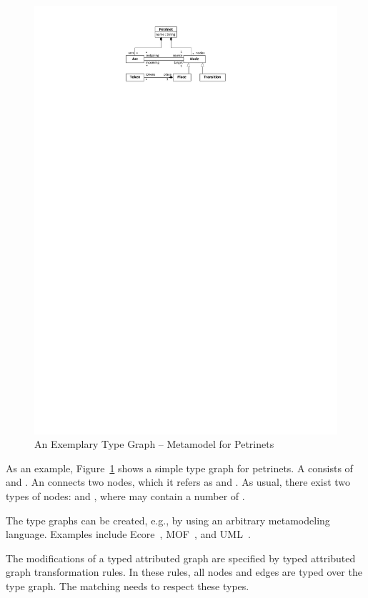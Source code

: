 \begin{figure}[htb]
  \centering
  \includegraphics[scale=1]{figures/Petrinet}
  \caption{An Exemplary Type Graph -- Metamodel for Petrinets}
  \label{fig:PetrinetTypeGraph}
\end{figure}

As an example, Figure~\ref{fig:PetrinetTypeGraph} shows a simple type graph for petrinets.
A  consists of  and .
An  connects two nodes, which it refers as  and .
As usual, there exist two types of nodes:  and , where  may contain a number of .

The type graphs can be created, e.g., by using an arbitrary metamodeling language.
Examples include Ecore~\cite{SBP+08}, MOF~\cite{MOF05}, and UML~\cite{UML23}.

The modifications of a typed attributed graph are specified by typed attributed graph transformation rules.
In these rules, all nodes and edges are typed over the type graph. The matching needs to respect these types.

